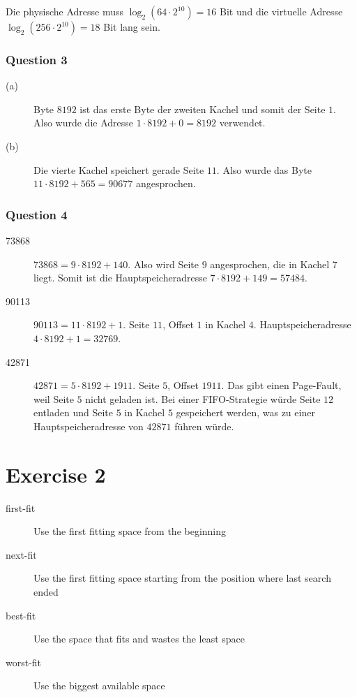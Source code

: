 \documentclass[10pt,a4paper]{article}
\begin{document}
Die physische Adresse muss $\log_{2}(64 \cdot  2^{10}) = 16$ Bit und die virtuelle Adresse $\log_{2}(256 \cdot 2^{10}) = 18$ Bit lang sein.

\subsubsection*{Question 3}

\begin{description}
\item[(a)] Byte $8192$ ist das erste Byte der zweiten Kachel und somit der Seite $1$.
  Also wurde die Adresse $1 \cdot 8192 + 0 = 8192$ verwendet.
\item[(b)] Die vierte Kachel speichert gerade Seite $11$.
  Also wurde das Byte $11 \cdot 8192 + 565 = 90677$ angesprochen.
\end{description}

\subsubsection*{Question 4}

\begin{description}
\item[73868] $73868 = 9 \cdot 8192 + 140$.
  Also wird Seite $9$ angesprochen, die in Kachel 7 liegt.
  Somit ist die Hauptspeicheradresse $7 \cdot 8192 + 149 = 57484$.
\item[90113] $90113 = 11 \cdot 8192 + 1$.
  Seite $11$, Offset $1$ in Kachel $4$.
  Hauptspeicheradresse $4 \cdot 8192 + 1 = 32769$.
\item[42871] $42871 = 5 \cdot 8192 + 1911$.
  Seite $5$, Offset $1911$.
  Das gibt einen Page-Fault, weil Seite $5$ nicht geladen ist.
  Bei einer FIFO-Strategie würde Seite $12$ entladen und Seite $5$ in Kachel $5$ gespeichert werden, was zu einer Hauptspeicheradresse von $42871$ führen würde.
\end{description}

\section*{Exercise 2}

\begin{description}
\item[first-fit] Use the first fitting space from the beginning
\item[next-fit] Use the first fitting space starting from the position where last search ended
\item[best-fit] Use the space that fits and wastes the least space
\item[worst-fit] Use the biggest available space
\end{description}
\end{document}
